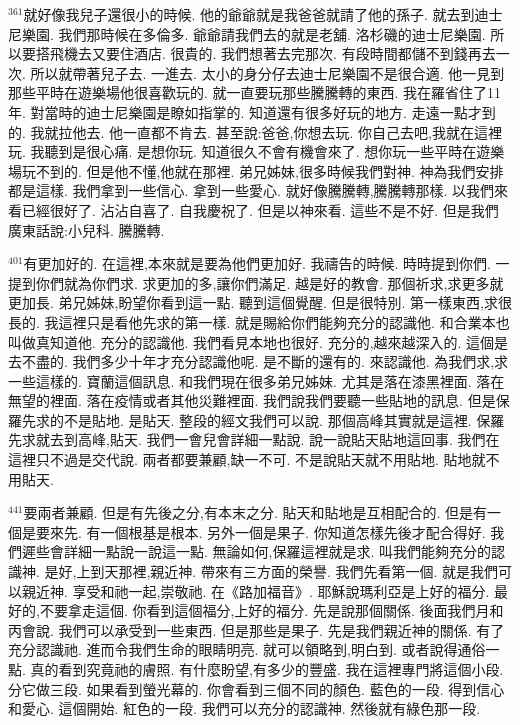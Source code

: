 \documentclass{book}
\begin{document}
$^{361}$就好像我兒子還很小的時候.
他的爺爺就是我爸爸就請了他的孫子.
就去到迪士尼樂園.
我們那時候在多倫多.
爺爺請我們去的就是老舖.
洛杉磯的迪士尼樂園.
所以要搭飛機去又要住酒店.
很貴的.
我們想著去完那次.
有段時間都儲不到錢再去一次.
所以就帶著兒子去.
一進去.
太小的身分仔去迪士尼樂園不是很合適.
他一見到那些平時在遊樂場他很喜歡玩的.
就一直要玩那些騰騰轉的東西.
我在羅省住了11年.
對當時的迪士尼樂園是瞭如指掌的.
知道還有很多好玩的地方.
走遠一點才到的.
我就拉他去.
他一直都不肯去.
甚至說:爸爸,你想去玩.
你自己去吧,我就在這裡玩.
我聽到是很心痛.
是想你玩.
知道很久不會有機會來了.
想你玩一些平時在遊樂場玩不到的.
但是他不懂,他就在那裡.
弟兄姊妹,很多時候我們對神.
神為我們安排都是這樣.
我們拿到一些信心.
拿到一些愛心.
就好像騰騰轉,騰騰轉那樣.
以我們來看已經很好了.
沾沾自喜了.
自我慶祝了.
但是以神來看.
這些不是不好.
但是我們廣東話說:小兒科.
騰騰轉.

$^{401}$有更加好的.
在這裡,本來就是要為他們更加好.
我禱告的時候.
時時提到你們.
一提到你們就為你們求.
求更加的多,讓你們滿足.
越是好的教會.
那個祈求,求更多就更加長.
弟兄姊妹,盼望你看到這一點.
聽到這個覺醒.
但是很特別.
第一樣東西,求很長的.
我這裡只是看他先求的第一樣.
就是賜給你們能夠充分的認識他.
和合業本也叫做真知道他.
充分的認識他.
我們看見本地也很好.
充分的,越來越深入的.
這個是去不盡的.
我們多少十年才充分認識他呢.
是不斷的還有的.
來認識他.
為我們求,求一些這樣的.
寶蘭這個訊息.
和我們現在很多弟兄姊妹.
尤其是落在漆黑裡面.
落在無望的裡面.
落在疫情或者其他災難裡面.
我們說我們要聽一些貼地的訊息.
但是保羅先求的不是貼地.
是貼天.
整段的經文我們可以說.
那個高峰其實就是這裡.
保羅先求就去到高峰,貼天.
我們一會兒會詳細一點說.
說一說貼天貼地這回事.
我們在這裡只不過是交代說.
兩者都要兼顧,缺一不可.
不是說貼天就不用貼地.
貼地就不用貼天.

$^{441}$要兩者兼顧.
但是有先後之分,有本末之分.
貼天和貼地是互相配合的.
但是有一個是要來先.
有一個根基是根本.
另外一個是果子.
你知道怎樣先後才配合得好.
我們遲些會詳細一點說一說這一點.
無論如何,保羅這裡就是求.
叫我們能夠充分的認識神.
是好,上到天那裡,親近神.
帶來有三方面的榮譽.
我們先看第一個.
就是我們可以親近神.
享受和祂一起,崇敬祂.
在《路加福音》.
耶穌說瑪利亞是上好的福分.
最好的,不要拿走這個.
你看到這個福分,上好的福分.
先是說那個關係.
後面我們月和丙會說.
我們可以承受到一些東西.
但是那些是果子.
先是我們親近神的關係.
有了充分認識祂.
進而令我們生命的眼睛明亮.
就可以領略到,明白到.
或者說得通俗一點.
真的看到究竟祂的膚照.
有什麼盼望,有多少的豐盛.
我在這裡專門將這個小段.
分它做三段.
如果看到螢光幕的.
你會看到三個不同的顏色.
藍色的一段.
得到信心和愛心.
這個開始.
紅色的一段.
我們可以充分的認識神.
然後就有綠色那一段.
\end{document}

